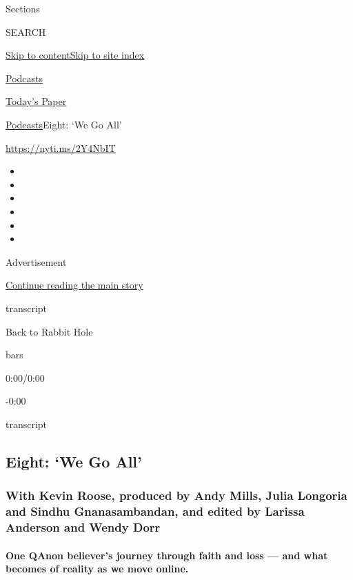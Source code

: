 Sections

SEARCH

\protect\hyperlink{site-content}{Skip to
content}\protect\hyperlink{site-index}{Skip to site index}

\href{https://www.nytimes.com/spotlight/podcasts}{Podcasts}

\href{https://myaccount.nytimes.com/auth/login?response_type=cookie\&client_id=vi}{}

\href{https://www.nytimes.com/section/todayspaper}{Today's Paper}

\href{/spotlight/podcasts}{Podcasts}\textbar{}Eight: `We Go All'

\url{https://nyti.ms/2Y4NbIT}

\begin{itemize}
\item
\item
\item
\item
\item
\item
\end{itemize}

Advertisement

\protect\hyperlink{after-top}{Continue reading the main story}

transcript

Back to Rabbit Hole

bars

0:00/0:00

-0:00

transcript

\hypertarget{eight-we-go-all}{%
\subsection{Eight: `We Go All'}\label{eight-we-go-all}}

\hypertarget{with-kevin-roose-produced-by-andy-mills-julia-longoria-and-sindhu-gnanasambandan-and-edited-by-larissa-anderson-and-wendy-dorr}{%
\subsubsection{With Kevin Roose, produced by Andy Mills, Julia Longoria
and Sindhu Gnanasambandan, and edited by Larissa Anderson and Wendy
Dorr}\label{with-kevin-roose-produced-by-andy-mills-julia-longoria-and-sindhu-gnanasambandan-and-edited-by-larissa-anderson-and-wendy-dorr}}

\hypertarget{one-qanon-believers-journey-through-faith-and-loss--and-what-becomes-of-reality-as-we-move-online}{%
\paragraph{One QAnon believer's journey through faith and loss --- and
what becomes of reality as we move
online.}\label{one-qanon-believers-journey-through-faith-and-loss--and-what-becomes-of-reality-as-we-move-online}}

